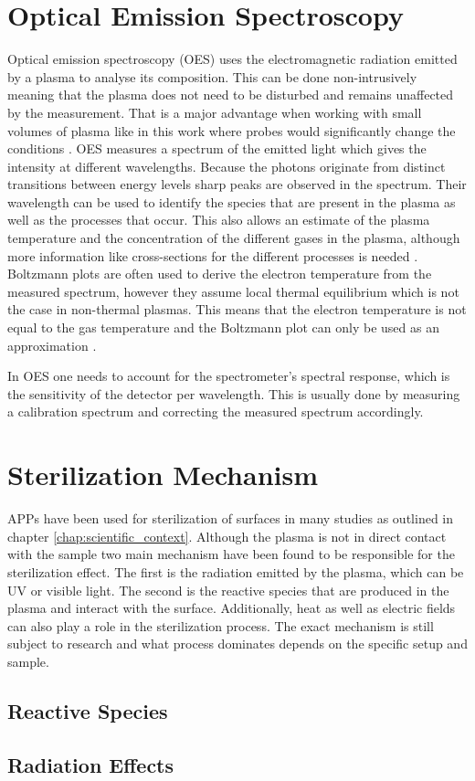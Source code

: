 \section{Optical Emission Spectroscopy}
Optical emission spectroscopy (OES) uses the electromagnetic radiation emitted by a plasma to analyse its composition. This can be done non-intrusively meaning that the plasma does not need to be disturbed and remains unaffected by the measurement. That is a major advantage when working with small volumes of plasma like in this work where probes would significantly change the conditions \cite{plasma2}. OES measures a spectrum of the emitted light which gives the intensity at different wavelengths. Because the photons originate from distinct transitions between energy levels sharp peaks are observed in the spectrum. Their wavelength can be used to identify the species that are present in the plasma as well as the processes that occur. This also allows an estimate of the plasma temperature and the concentration of the different gases in the plasma, although more information like cross-sections for the different processes is needed \cite{plasma2}. Boltzmann plots are often used to derive the electron temperature from the measured spectrum, however they assume local thermal equilibrium which is not the case in non-thermal plasmas. This means that the electron temperature is not equal to the gas temperature and the Boltzmann plot can only be used as an approximation \cite{plasma2}. 

In OES one needs to account for the spectrometer's spectral response, which is the sensitivity of the detector per wavelength. This is usually done by measuring a calibration spectrum and correcting the measured spectrum accordingly. 

\section{Sterilization Mechanism}
APPs have been used for sterilization of surfaces in many studies as outlined in chapter \ref{chap:scientific_context}. Although the plasma is not in direct contact with the sample two main mechanism have been found to be responsible for the sterilization effect. The first is the radiation emitted by the plasma, which can be UV or visible light. The second is the reactive species that are produced in the plasma and interact with the surface. Additionally, heat as well as electric fields can also play a role in the sterilization process. The exact mechanism is still subject to research and what process dominates depends on the specific setup and sample.

\subsection{Reactive Species}


\subsection{Radiation Effects}